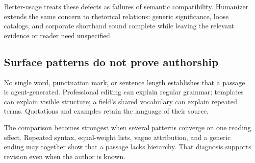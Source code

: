 Better-usage treats these defects as failures of semantic compatibility.
Humanizer extends the same concern to rhetorical relations: generic
significance, loose catalogs, and corporate shorthand sound complete while
leaving the relevant evidence or reader need unspecified.

\subsection{Surface patterns do not prove authorship}

No single word, punctuation mark, or sentence length establishes that a
passage is agent-generated. Professional editing can explain regular grammar;
templates can explain visible structure; a field's shared vocabulary can
explain repeated terms. Quotations and examples retain the language of their
source.

The comparison becomes strongest when several patterns converge on one reading
effect. Repeated syntax, equal-weight lists, vague attribution, and a generic
ending may together show that a passage lacks hierarchy. That diagnosis
supports revision even when the author is known.
